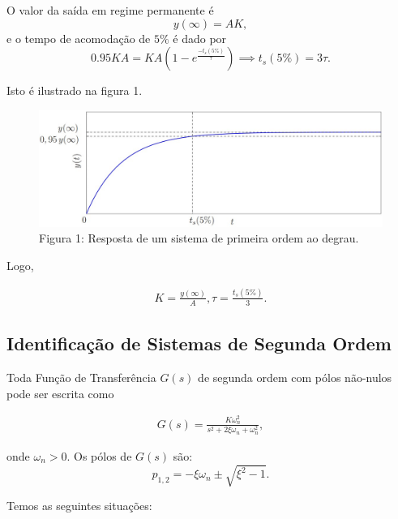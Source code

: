 \documentclass[
]{book}
\begin{document}
O valor da saída em regime permanente é
\[
y(\infty) = AK,
\]
e o tempo de acomodação de \(5\%\) é dado por
\[
0.95KA = KA(1- e^{\frac {-t_s(5\%)}{\tau}}) \implies t_s(5\%) =3 \tau.
\]

Isto é ilustrado na figura 1.

\begin{figure}
\centering
\includegraphics{Imagens/Lab3/Explicação/fig1.jpg}
\caption{Figura 1: Resposta de um sistema de primeira ordem ao degrau.}
\end{figure}

Logo,

\begin{align}
K = \frac{y(\infty)}{A},  \tau = \frac {t_s(5\%)}{3}. \label{eq:eq32}
\end{align}

\hypertarget{identificauxe7uxe3o-de-sistemas-de-segunda-ordem}{%
\subsection{Identificação de Sistemas de Segunda Ordem}\label{identificauxe7uxe3o-de-sistemas-de-segunda-ordem}}

Toda Função de Transferência \(G(s)\) de segunda ordem com pólos não-nulos pode ser escrita como

\begin{align}
G(s) = \frac {K \omega_n^2}{s^2+2\xi \omega_n+ \omega_n^2}, \label{eq:eq33}
\end{align}

onde \(\omega_n > 0\). Os pólos de \(G(s)\) são:
\[
p_{1,2} = - \xi \omega_n \pm \sqrt{\xi^2 -1}.
\]

Temos as seguintes situações:
\end{document}

